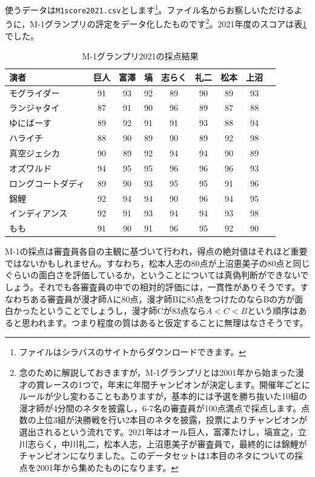 \documentclass{ltjsbook}
\begin{document}
使うデータは\verb|M1score2021.csv|とします\footnote{ファイルはシラバスのサイトからダウンロードできます。}。ファイル名からお察しいただけるように，M-1グランプリの評定をデータ化したものです\footnote{念のために解説しておきますが，M-1グランプリとは2001年から始まった漫才の賞レースの1つで，年末に年間チャンピオンが決定します。開催年ごとにルールが少し変わることもありますが，基本的には予選を勝ち抜いた10組の漫才師が4分間のネタを披露し，6-7名の審査員が100点満点で採点します。点数の上位3組が決勝戦を行い2本目のネタを披露，投票によりチャンピオンが選出されるという流れです。2021年はオール巨人，富澤たけし，塙宣之，立川志らく，中川礼二，松本人志，上沼恵美子が審査員で，最終的には錦鯉がチャンピオンになりました。このデータセットは1本目のネタについての採点を2001年から集めたものになります。}。2021年度のスコアは表\ref{tbl:15_02}でした。

\begin{table}[ht]
	\centering
	\caption{M-1グランプリ2021の採点結果}
	\begin{tabular}{l|cccccccc}
		\hline
		演者        & 巨人 & 富澤 & 塙  & 志らく & 礼二 & 松本 & 上沼 \\
		\hline
		モグライダー    & 91 & 93 & 92 & 89  & 90 & 89 & 93 \\
		ランジャタイ    & 87 & 91 & 90 & 96  & 89 & 87 & 88 \\
		ゆにばーす     & 89 & 92 & 91 & 91  & 93 & 88 & 94 \\
		ハライチ      & 88 & 90 & 89 & 90  & 89 & 92 & 98 \\
		真空ジェシカ    & 90 & 89 & 92 & 94  & 94 & 90 & 89 \\
		オズワルド     & 94 & 95 & 95 & 96  & 96 & 96 & 93 \\
		ロングコートダディ & 89 & 90 & 93 & 95  & 95 & 91 & 96 \\
		錦鯉        & 92 & 94 & 94 & 90  & 96 & 94 & 95 \\
		インディアンス   & 92 & 91 & 93 & 94  & 94 & 93 & 98 \\
		もも        & 91 & 90 & 91 & 96  & 95 & 92 & 90 \\
		\hline
	\end{tabular}
	\label{tbl:15_02}
\end{table}


M-1の採点は審査員各自の主観に基づいて行われ，得点の絶対値はそれほど重要ではないかもしれません。すなわち，松本人志の80点が上沼恵美子の80点と同じぐらいの面白さを評価しているか，ということについては真偽判断ができないでしょう。それでも各審査員の中での相対的評価には，一貫性がありそうです。すなわちある審査員が漫才師Aに80点，漫才師Bに85点をつけたのならBの方が面白かったということでしょうし，漫才師Cが83点なら$A<C<B$という順序はあると思われます。つまり程度の質はあると仮定することに無理はなさそうです。
\end{document}
